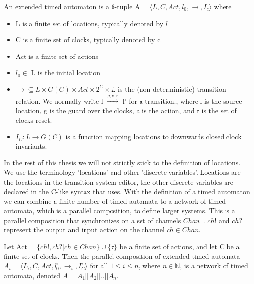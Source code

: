 \begin{mydef}
\label{def:TA}
An extended timed automaton is a 6-tuple A = $\langle L, C, Act, l_0, \rightarrow, I_c\rangle$ where
{\renewcommand\labelitemi{--}
	\begin{itemize}
		\item L is a finite set of locations, typically denoted by $l$
		\item C is a finite set of clocks, typically denoted by c
		\item Act is a finite set of actions
		\item $l_0 \in$ L is the initial location
		\item $\rightarrow \subseteq L \times G(C) \times Act \times 2^C \times L$ is the (non-deterministic) transition relation. We normally write l $\stackrel{g,a,r}{\longrightarrow}$ l' for a transition., where l is the source location, g is the guard over the clocks, a is the action, and r is the set of clocks reset.
		\item $I_C : L \rightarrow G(C)$ is a function mapping locations to downwards closed clock invariants.
	\end{itemize}
}
\end{mydef}

In the rest of this thesis we will not strictly stick to the definition of locations. We use the terminology 'locations' and other 'discrete variables'. Locations are the locations in the \uppaal{} transition system editor, the other discrete variables are declared in the C-like syntax that \uppaal{} uses. With the definition of a timed automaton we can combine a finite number of timed automata to a network of timed automata, which is a parallel composition, to define larger systems. This is a parallel composition that synchronizes on a set of channels $Chan$~\cite{UPPAAL}. $ch!$ and $ch?$ represent the output and input action on the channel $ch \in Chan$.

\begin{mydef}
\label{def:networkTA}
Let Act = $\{ch!,ch?|ch \in Chan\} \cup \{\tau\}$ be a finite set of actions, and let C be a finite set of clocks. Then the parallel composition of extended timed automata $A_i = \langle L_i, C, Act, l^i_0, \rightarrow_{i}, I^i_C\rangle$ for all $1 \leq i \leq n$, where $n \in \mathbb{N}$, is a network of timed automata, denoted $A = A_1||A_2||..||A_n$.
\end{mydef}

